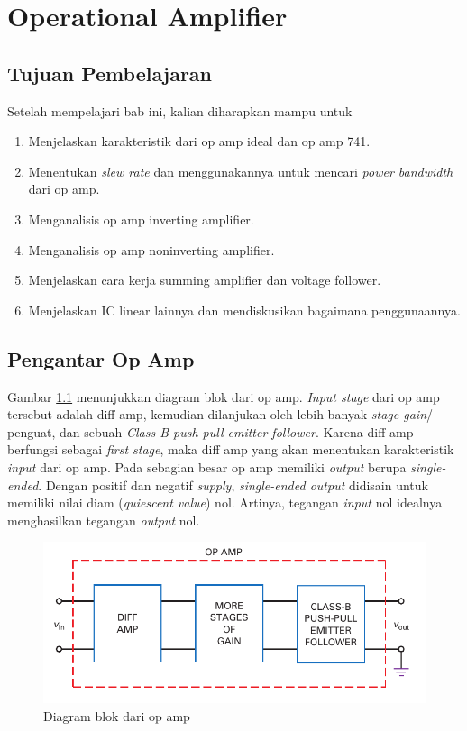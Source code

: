 \chapter{Operational Amplifier}

\section{Tujuan Pembelajaran}

Setelah mempelajari bab ini, kalian diharapkan mampu untuk

\begin{enumerate}
	\item Menjelaskan karakteristik dari op amp ideal dan op amp 741.
	\item Menentukan \textit{slew rate} dan menggunakannya untuk mencari \textit{power bandwidth} dari op amp.
	\item Menganalisis op amp inverting amplifier.
	\item Menganalisis op amp noninverting amplifier.
	\item Menjelaskan cara kerja summing amplifier dan voltage follower.
	\item Menjelaskan IC linear lainnya dan mendiskusikan bagaimana penggunaannya.
\end{enumerate}

\section{Pengantar Op Amp}

Gambar \ref{fig:16.01} menunjukkan diagram blok dari op amp. \textit{Input stage} dari op amp tersebut adalah diff amp, kemudian dilanjukan oleh lebih banyak \textit{stage gain}/ penguat, dan sebuah \textit{Class-B push-pull emitter follower}. Karena diff amp berfungsi sebagai \textit{first stage}, maka diff amp yang akan menentukan karakteristik \textit{input} dari op amp. Pada sebagian besar op amp memiliki \textit{output} berupa \textit{single-ended}. Dengan positif dan negatif \textit{supply}, \textit{single-ended output} didisain untuk memiliki nilai diam (\textit{quiescent value}) nol. Artinya, tegangan \textit{input} nol idealnya menghasilkan tegangan \textit{output} nol.

\begin{figure}
	\centering
	\includegraphics[width=0.7\linewidth]{pic/fig:16.01}
	\caption{Diagram blok dari op amp}
	\label{fig:16.01}
\end{figure}

